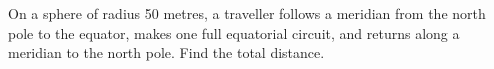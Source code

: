 On a sphere of radius 50 metres, a traveller follows a meridian from the north pole to the equator, makes one full equatorial circuit, and returns along a meridian to the north pole. Find the total distance.
